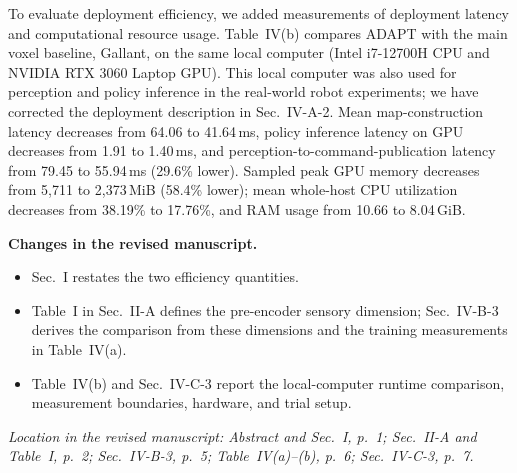 \documentclass[11pt]{article}
\newcommand{\Changes}{\par\noindent\textbf{Changes in the revised manuscript.}\ }
\newcommand{\Location}[1]{\par\noindent\textit{Location in the revised manuscript: #1}}
\begin{document}
To evaluate deployment efficiency, we added measurements of deployment latency and computational resource usage. Table~IV(b) compares ADAPT with the main voxel baseline, Gallant, on the same local computer (Intel i7-12700H CPU and NVIDIA RTX 3060 Laptop GPU). This local computer was also used for perception and policy inference in the real-world robot experiments; we have corrected the deployment description in Sec.~IV-A-2. Mean map-construction latency decreases from 64.06 to 41.64\,ms, policy inference latency on GPU decreases from 1.91 to 1.40\,ms, and perception-to-command-publication latency from 79.45 to 55.94\,ms (29.6\% lower). Sampled peak GPU memory decreases from 5,711 to 2,373\,MiB (58.4\% lower); mean whole-host CPU utilization decreases from 38.19\% to 17.76\%, and RAM usage from 10.66 to 8.04\,GiB.
\Changes
\begin{itemize}
    \item Sec.~I restates the two efficiency quantities.
    \item Table~I in Sec.~II-A defines the pre-encoder sensory dimension; Sec.~IV-B-3 derives the comparison from these dimensions and the training measurements in Table~IV(a).
    \item Table~IV(b) and Sec.~IV-C-3 report the local-computer runtime comparison, measurement boundaries, hardware, and trial setup.
\end{itemize}
\Location{Abstract and Sec.~I, p.~1; Sec.~II-A and Table~I, p.~2; Sec.~IV-B-3, p.~5; Table~IV(a)--(b), p.~6; Sec.~IV-C-3, p.~7.}
\end{document}
